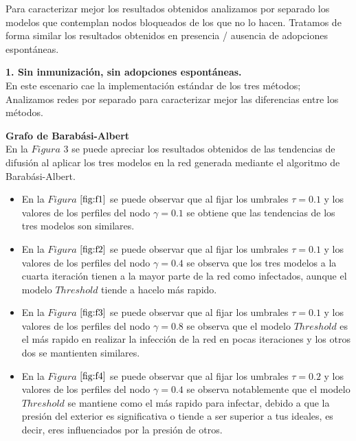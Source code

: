 \documentclass{article}
\begin{document}
Para caracterizar mejor los resultados obtenidos analizamos por separado los modelos que contemplan nodos bloqueados de los que no lo hacen. Tratamos de forma similar los resultados obtenidos en presencia / ausencia de adopciones espontáneas.

\textbf{1. Sin inmunización, sin adopciones espontáneas.}\\
En este escenario cae la implementación estándar de los tres métodos; Analizamos redes por separado para caracterizar mejor las diferencias entre los métodos.

\textbf{Grafo de Barabási-Albert}
\\
En la $Figura$ $3$ se puede apreciar los resultados obtenidos de las tendencias de difusión al aplicar los tres modelos en la red generada mediante el algoritmo de Barabási-Albert. 
\begin{itemize}
	\item En la $Figura$ $\ref{fig:f1}$ se puede observar que al fijar los umbrales $\tau = 0.1$ y los valores de los perfiles del nodo $\gamma = 0.1$ se obtiene que las tendencias de los tres modelos son similares.
	\item En la $Figura$ $\ref{fig:f2}$ se puede observar que al fijar los umbrales $\tau = 0.1$ y los valores de los perfiles del nodo $\gamma = 0.4$ se observa que los tres modelos a la cuarta iteración tienen a la mayor parte de la red como infectados, aunque el modelo $Threshold$ tiende a hacelo más rapido.
	\item En la $Figura$ $\ref{fig:f3}$ se puede observar que al fijar los umbrales $\tau = 0.1$ y los valores de los perfiles del nodo $\gamma = 0.8$ se observa que el modelo $Threshold$ es el más rapido en realizar la infección de la red en pocas iteraciones y los otros dos se mantienten similares.
	\item En la $Figura$ $\ref{fig:f4}$ se puede observar que al fijar los umbrales $\tau = 0.2$ y los valores de los perfiles del nodo $\gamma = 0.4$ se observa notablemente que el modelo $Threshold$ se mantiene como el más rapido para infectar, debido a que la presión del exterior es significativa o tiende a ser superior a tus ideales, es decir, eres influenciados por la presión de otros.
\end{itemize}
\end{document}

